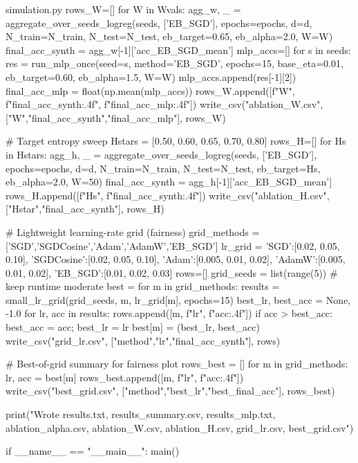 \begin{filecontents*}{simulation.py}
    rows_W=[]
    for W in Wvals:
        agg_w, _ = aggregate_over_seeds_logreg(seeds, ['EB_SGD'], epochs=epochs, d=d, N_train=N_train, N_test=N_test,
                                               eb_target=0.65, eb_alpha=2.0, W=W)
        final_acc_synth = agg_w[-1]['acc_EB_SGD_mean']
        mlp_accs=[]
        for s in seeds:
            res = run_mlp_once(seed=s, method='EB_SGD', epochs=15, base_eta=0.01, eb_target=0.60, eb_alpha=1.5, W=W)
            mlp_accs.append(res[-1][2])
        final_acc_mlp = float(np.mean(mlp_accs))
        rows_W.append([f"{W}", f"{final_acc_synth:.4f}", f"{final_acc_mlp:.4f}"])
    write_csv("ablation_W.csv", ["W","final_acc_synth","final_acc_mlp"], rows_W)

    # Target entropy sweep
    Hstars = [0.50, 0.60, 0.65, 0.70, 0.80]
    rows_H=[]
    for Hs in Hstars:
        agg_h, _ = aggregate_over_seeds_logreg(seeds, ['EB_SGD'], epochs=epochs, d=d, N_train=N_train, N_test=N_test,
                                               eb_target=Hs, eb_alpha=2.0, W=50)
        final_acc_synth = agg_h[-1]['acc_EB_SGD_mean']
        rows_H.append([f"{Hs}", f"{final_acc_synth:.4f}"])
    write_csv("ablation_H.csv", ["Hstar","final_acc_synth"], rows_H)

    # Lightweight learning-rate grid (fairness)
    grid_methods = ['SGD','SGDCosine','Adam','AdamW','EB_SGD']
    lr_grid = {
        'SGD':[0.02, 0.05, 0.10],
        'SGDCosine':[0.02, 0.05, 0.10],
        'Adam':[0.005, 0.01, 0.02],
        'AdamW':[0.005, 0.01, 0.02],
        'EB_SGD':[0.01, 0.02, 0.03]
    }
    rows=[]
    grid_seeds = list(range(5))  # keep runtime moderate
    best = {}
    for m in grid_methods:
        results = small_lr_grid(grid_seeds, m, lr_grid[m], epochs=15)
        best_lr, best_acc = None, -1.0
        for lr, acc in results:
            rows.append([m, f"{lr}", f"{acc:.4f}"])
            if acc > best_acc:
                best_acc = acc; best_lr = lr
        best[m] = (best_lr, best_acc)
    write_csv("grid_lr.csv", ["method","lr","final_acc_synth"], rows)

    # Best-of-grid summary for fairness plot
    rows_best = []
    for m in grid_methods:
        lr, acc = best[m]
        rows_best.append([m, f"{lr}", f"{acc:.4f}"])
    write_csv("best_grid.csv", ["method","best_lr","best_final_acc"], rows_best)

    print("Wrote results.txt, results_summary.csv, results_mlp.txt, ablation_alpha.csv, ablation_W.csv, ablation_H.csv, grid_lr.csv, best_grid.csv")

if __name__ == "__main__":
    main()
\end{filecontents*}

